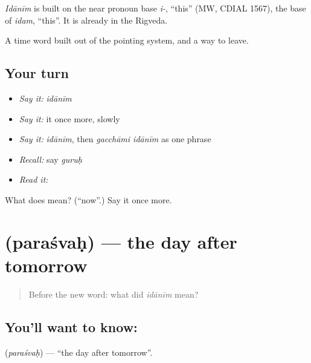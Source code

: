 \begin{cousinweb}
\emph{Idānīm} is built on the near pronoun base \emph{i-}, \textquotedblleft{}this\textquotedblright{} (MW, CDIAL 1567), the base of \emph{idam}, \textquotedblleft{}this\textquotedblright{}. It is already in the Rigveda.
\end{cousinweb}

\begin{grammarlens}[title={What you've built}]
A time word built out of the pointing system, and a way to leave.
\end{grammarlens}

\subsection*{Your turn}
\begin{itemize}
\raggedright
  \item \emph{Say it:} \emph{idānīm}
  \item \emph{Say it:} it once more, slowly
  \item \emph{Say it:} \emph{idānīm}, then \emph{gacchāmi idānīm} as one phrase
  \item \emph{Recall:} say \emph{guruḥ}
  \item \emph{Read it:} \textbf{}
\end{itemize}

\begin{tcolorbox}[breakable,colback=teal!4,colframe=teal!35!black,title={Before you move on}]
What does  mean? (\textquotedblleft{}now\textquotedblright{}.) Say it once more.
\end{tcolorbox}
\section[\texorpdfstring{\sk{परश्वः} (paraśvaḥ)}{परश्वः (paraśvaḥ)}]{ (paraśvaḥ) — the day after tomorrow}

\label{lesson:SA-C28-day-after}



\begin{quote}
Before the new word: what did \emph{idānīm} mean?
\end{quote}

\subsection*{You'll want to know: }
\textbf{} (\emph{paraśvaḥ}) — \textquotedblleft{}the day after tomorrow\textquotedblright{}.

